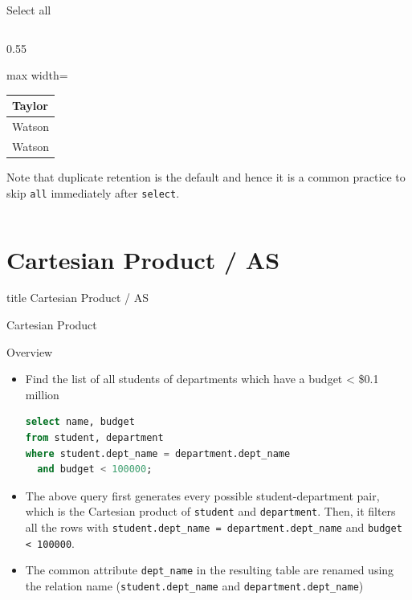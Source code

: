 \documentclass[aspectratio=169, xcolor=dvipsnames]{beamer}
\begin{document}
\begin{frame}[fragile]{Select all}
\begin{columns}
\begin{column}{0.55\textwidth}
\begin{center}
\begin{adjustbox}{max width=\textwidth}
\begin{tabular}{|l|}
                Taylor \\ \hline
                Watson \\ \hline
                Watson \\ \hline
                \end{tabular}
                \end{adjustbox}
            \end{center}
            \small Note that duplicate retention is the default and hence it is a common practice to skip \texttt{all} immediately after \texttt{select}.
        \end{column}
    \end{columns}
\end{frame}

\section{Cartesian Product / AS}
\begin{frame}
  \vfill
  \centering
  \begin{beamercolorbox}[sep=8pt,center,shadow=true,rounded=true]{title}
    Cartesian Product / AS\par%
  \end{beamercolorbox}
  \vfill
\end{frame}

\begin{frame}[fragile]{Cartesian Product}
    \begin{block}{Overview}
        \begin{itemize}[<+->]
            \item Find the list of all students of departments which have a budget < \$0.1 million
            \begin{lstlisting}[language=SQL]
select name, budget 
from student, department 
where student.dept_name = department.dept_name 
  and budget < 100000;
            \end{lstlisting}
            \item The above query first generates every possible student-department pair, which is the Cartesian product of \texttt{student} and \texttt{department}. Then, it filters all the rows with \texttt{student.dept\_name = department.dept\_name} and \texttt{budget < 100000}.
            \item The common attribute \texttt{dept\_name} in the resulting table are renamed using the relation name (\texttt{student.dept\_name} and \texttt{department.dept\_name})
        \end{itemize}
    \end{block}
\end{frame}
\end{document}
